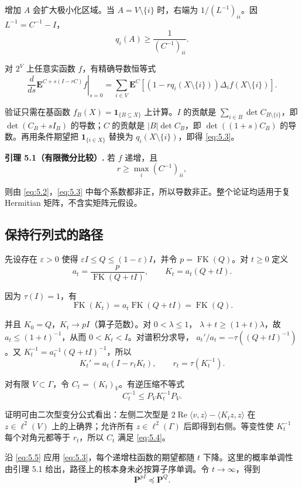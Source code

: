 \documentclass[UTF8,zihao=-4,a4paper]{ctexart}
\numberwithin{equation}{section}
\begin{document}
增加 \(A\) 会扩大极小化区域。当 \(A=V\setminus\{i\}\) 时，右端为
\(1/(L^{-1})_{ii}\)。因 \(L^{-1}=C^{-1}-I\)，
\[
q_i(A)\ge\frac1{(C^{-1})_{ii}}.
\tag{5.2}\label{eq:5.2}
\]


对 \(2^V\) 上任意实函数 \(f\)，有精确导数恒等式
\[
\left.\frac{d}{ds}\mathbf E^{C+s(I-rC)}f\right|_{s=0}
=\sum_{i\in V}\mathbf E^C
\left[(1-rq_i(X\setminus\{i\}))\Delta_i f(X\setminus\{i\})\right].
\tag{5.3}\label{eq:5.3}
\]

验证只需在基函数 \(f_B(X)=\mathbf1_{\{B\subseteq X\}}\) 上计算。\(I\) 的贡献是
\(\sum_{i\in B}\det C_{B\setminus\{i\}}\)，即
\(\det(C_B+sI_B)\) 的导数；\(C\) 的贡献是 \(|B|\det C_B\)，即
\(\det((1+s)C_B)\) 的导数。再用条件期望把
\(\mathbf1_{\{i\in X\}}\) 替换为 \(q_i(X\setminus\{i\})\)，即得 \eqref{eq:5.3}。

\textbf{引理 5.1（有限微分比较）.} 若 \(f\) 递增，且
\[
r\ge\max_i(C^{-1})_{ii},
\tag{5.4}\label{eq:5.4}
\]

则由 \eqref{eq:5.2}，\eqref{eq:5.3} 中每个系数都非正，所以导数非正。整个论证均适用于复 Hermitian 矩阵，不含实矩阵元假设。

\subsection{保持行列式的路径}

先设存在 \(\varepsilon>0\) 使得 \(\varepsilon I\le Q\le(1-\varepsilon)I\)，并令
\(p=\operatorname{FK}(Q)\)。对 \(t\ge0\) 定义
\[
a_t=\frac{p}{\operatorname{FK}(Q+tI)},\qquad
K_t=a_t(Q+tI).
\tag{5.5}\label{eq:5.5}
\]

因为 \(\tau(I)=1\)，有
\[
\operatorname{FK}(K_t)=a_t\operatorname{FK}(Q+tI)=\operatorname{FK}(Q).
\]

并且 \(K_0=Q\)，\(K_t\to pI\)（算子范数）。对 \(0<\lambda\le1\)，
\(\lambda+t\ge(1+t)\lambda\)，故 \(a_t\le(1+t)^{-1}\)，从而 \(0<K_t<I\)。对谱积分求导，
\(a_t'/a_t=-\tau((Q+tI)^{-1})\)。又
\(K_t^{-1}=a_t^{-1}(Q+tI)^{-1}\)，所以
\[
K_t'=a_t(I-r_tK_t),\qquad r_t=\tau(K_t^{-1}).
\tag{5.6}\label{eq:5.6}
\]


对有限 \(V\subset\Gamma\)，令 \(C_t=(K_t)_V\)。有逆压缩不等式
\[
C_t^{-1}\le P_VK_t^{-1}P_V.
\tag{5.7}\label{eq:5.7}
\]

证明可由二次型变分公式看出：左侧二次型是
\(2\operatorname{Re}\langle v,z\rangle-\langle K_tz,z\rangle\)
在 \(z\in\ell^2(V)\) 上的上确界；允许所有
\(z\in\ell^2(\Gamma)\) 后即得到右侧。等变性使 \(K_t^{-1}\) 每个对角元都等于 \(r_t\)，所以 \(C_t\) 满足 \eqref{eq:5.4}。

沿 \eqref{eq:5.5} 应用 \eqref{eq:5.3}，每个递增柱函数的期望都随 \(t\) 下降。这里的概率单调性由引理 5.1 给出，路径上的核本身未必按算子序单调。令 \(t\to\infty\)，得到
\[
\mathbf P^{pI}\preceq\mathbf P^Q.
\tag{5.8}\label{eq:5.8}
\]
\end{document}
